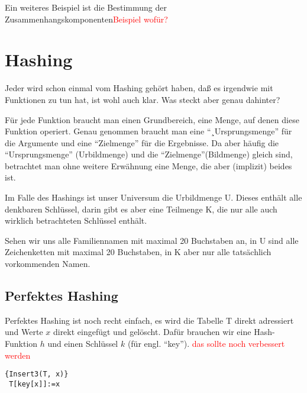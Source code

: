 Ein weiteres Beispiel ist die Bestimmung der Zusammenhangskomponenten\textcolor{red}{Beispiel wofür?}

\chapter{Hashing}
Jeder wird schon einmal vom Hashing gehört haben, daß es irgendwie mit Funktionen zu tun hat, ist wohl auch klar. Was
steckt aber genau dahinter?

Für jede Funktion braucht man einen Grundbereich, eine Menge, auf denen diese Funktion operiert. Genau genommen
braucht man eine "`¸Ursprungsmenge"' für die Argu\-mente und eine "`Zielmenge"' für die Ergebnisse. Da aber häufig die
"`Ursprungsmenge"' (Urbildmenge) und die "`Zielmenge"'(Bildmenge) gleich sind, betrachtet man ohne weitere Erwähnung
eine Menge, die aber (implizit) beides ist.

Im Falle des Hashings ist unser Universum die Urbildmenge U. Dieses enthält alle denkbaren Schlüssel, darin gibt es
aber eine Teilmenge K, die nur alle auch wirklich betrachteten Schlüssel enthält.

Sehen wir uns alle Familiennamen mit maximal 20 Buchstaben an, in U sind alle Zeichenketten mit maximal 20 Buchstaben,
in K aber nur alle tatsächlich vorkommenden Namen.

\section{Perfektes Hashing}
Perfektes Hashing ist noch recht einfach, es wird die Tabelle T direkt adressiert und Werte $x$ direkt eingefügt und
gelöscht. Dafür brauchen wir eine Hash-Funktion $h$ und einen Schlüssel $k$ (für engl. "`key"').
\textcolor{red}{das sollte noch verbessert werden}

\begin{Algorithmus}[H]
\begin{lstlisting}[frame=tlrb, mathescape=true, title=\textsc{Insert\textnormal{(T, x)}},gobble=1]{Insert3(T, x)}
 T[key[x]]:=x
\end{lstlisting}
\end{Algorithmus} 

